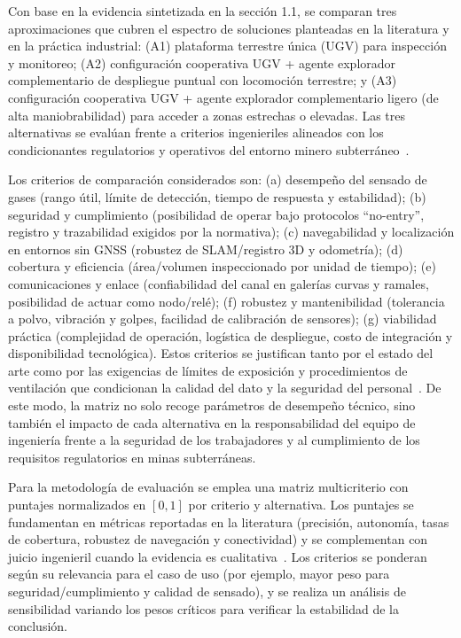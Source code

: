 Con base en la evidencia sintetizada en la sección 1.1, se comparan tres aproximaciones que cubren el espectro de soluciones planteadas en la literatura y en la práctica industrial: (A1) plataforma terrestre única (UGV) para inspección y monitoreo; (A2) configuración cooperativa UGV + agente explorador complementario de despliegue puntual con locomoción terrestre; y (A3) configuración cooperativa UGV + agente explorador complementario ligero (de alta maniobrabilidad) para acceder a zonas estrechas o elevadas. Las tres alternativas se evalúan frente a criterios ingenieriles alineados con los condicionantes regulatorios y operativos del entorno minero subterráneo~\cite{MINEM_DS024_2016,OSINERGMIN_BoletinGSM_2020,OSINERGMIN_BoletinGSM_2020b}.

Los criterios de comparación considerados son: (a) desempeño del sensado de gases (rango útil, límite de detección, tiempo de respuesta y estabilidad); (b) seguridad y cumplimiento (posibilidad de operar bajo protocolos ``no-entry'', registro y trazabilidad exigidos por la normativa); (c) navegabilidad y localización en entornos sin GNSS (robustez de SLAM/registro 3D y odometría); (d) cobertura y eficiencia (área/volumen inspeccionado por unidad de tiempo); (e) comunicaciones y enlace (confiabilidad del canal en galerías curvas y ramales, posibilidad de actuar como nodo/relé); (f) robustez y mantenibilidad (tolerancia a polvo, vibración y golpes, facilidad de calibración de sensores); (g) viabilidad práctica (complejidad de operación, logística de despliegue, costo de integración y disponibilidad tecnológica). Estos criterios se justifican tanto por el estado del arte como por las exigencias de límites de exposición y procedimientos de ventilación que condicionan la calidad del dato y la seguridad del personal~\cite{MINEM_DS024_2016,EU_ExposureDirective_2020}. De este modo, la matriz no solo recoge parámetros de desempeño técnico, sino también el impacto de cada alternativa en la responsabilidad del equipo de ingeniería frente a la seguridad de los trabajadores y al cumplimiento de los requisitos regulatorios en minas subterráneas.


Para la metodología de evaluación se emplea una matriz multicriterio con puntajes normalizados en $[0,1]$ por criterio y alternativa. Los puntajes se fundamentan en métricas reportadas en la literatura (precisión, autonomía, tasas de cobertura, robustez de navegación y conectividad) y se complementan con juicio ingenieril cuando la evidencia es cualitativa~\cite{AdvancesMining_2023,KimChoi_2025_MineMapping,AdaptiveControl_Mines_2024}. Los criterios se ponderan según su relevancia para el caso de uso (por ejemplo, mayor peso para seguridad/cumplimiento y calidad de sensado), y se realiza un análisis de sensibilidad variando los pesos críticos para verificar la estabilidad de la conclusión.


